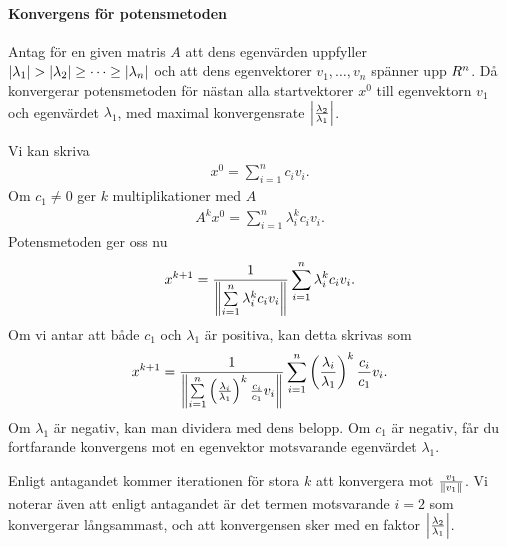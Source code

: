 \paragraph{Konvergens för potensmetoden}
Antag för en given matris $A$ att dens egenvärden uppfyller $\abs{\lambda_{1}} > \abs{\lambda_{2}} \geq \dots \geq \abs{\lambda_{n}}$ och att dens egenvektorer $v_{1}, \dots, v_{n}$ spänner upp $R^{n}$. Då konvergerar potensmetoden för nästan alla startvektorer $x^{0}$ till egenvektorn $v_{1}$ och egenvärdet $\lambda_{1}$, med maximal konvergensrate $\abs{\frac{\lambda_{2}}{\lambda_{1}}}$.

\proof
Vi kan skriva
\begin{align*}
	x^{0} = \sum\limits_{i = 1}^{n}c_{i}v_{i}.
\end{align*}
Om $c_{1} \neq 0$ ger $k$ multiplikationer med $A$
\begin{align*}
	A^{k}x^{0} = \sum\limits_{i = 1}^{n}\lambda_{i}^{k}c_{i}v_{i}.
\end{align*}
Potensmetoden ger oss nu
\begin{align*}
	x^{k + 1} = \frac{1}{\norm{\sum\limits_{i = 1}^{n}\lambda_{i}^{k}c_{i}v_{i}}}\sum\limits_{i = 1}^{n}\lambda_{i}^{k}c_{i}v_{i}.
\end{align*}
Om vi antar att både $c_{1}$ och $\lambda_{1}$ är positiva, kan detta skrivas som
\begin{align*}
	x^{k + 1} = \frac{1}{\norm{\sum\limits_{i = 1}^{n}\left(\frac{\lambda_{i}}{\lambda_{1}}\right)^{k}\frac{c_{i}}{c_{1}}v_{i}}}\sum\limits_{i = 1}^{n}\left(\frac{\lambda_{i}}{\lambda_{1}}\right)^{k}\frac{c_{i}}{c_{1}}v_{i}.
\end{align*}
Om $\lambda_{1}$ är negativ, kan man dividera med dens belopp. Om $c_{1}$ är negativ, får du fortfarande konvergens mot en egenvektor motsvarande egenvärdet $\lambda_{1}$.

Enligt antagandet kommer iterationen för stora $k$ att konvergera mot $\frac{v_{1}}{\norm{v_{1}}}$. Vi noterar även att enligt antagandet är det termen motsvarande $i = 2$ som konvergerar långsammast, och att konvergensen sker med en faktor $\abs{\frac{\lambda_{2}}{\lambda_{1}}}$.